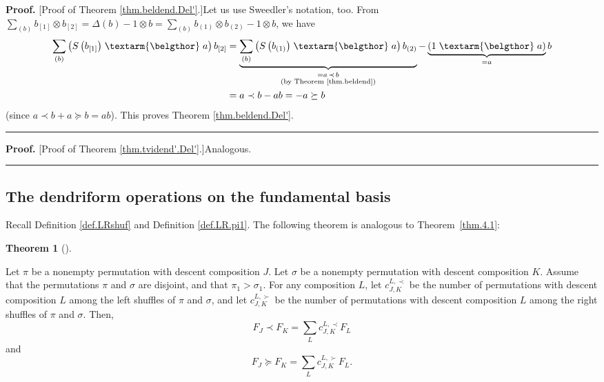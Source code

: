 \documentclass[numbers=enddot,12pt,final,onecolumn,notitlepage]{scrartcl}%
\theoremstyle{definition}
\newtheorem{theo}{Theorem}[section]
\newenvironment{theorem}[1][]
{\begin{theo}[#1]\begin{leftbar}}
{\end{leftbar}\end{theo}}
\newenvironment{proof}[1][Proof]{\noindent\textbf{#1.} }{\ \rule{0.5em}{0.5em}}
\newenvironment{verlong}{}{}
\newenvironment{noncompile}{}{}
\newcommand{\bel}{\left. \textarm{\belgthor} \right.}
\let\sumnonlimits\sum
\renewcommand{\sum}{\sumnonlimits\limits}
\begin{document}
\begin{verlong}
\begin{noncompile}
\begin{proof}
[Proof of Theorem \ref{thm.beldend.Del'}.]Let us use Sweedler's notation, too.
From $\sum_{\left(  b\right)  }b_{\left[  1\right]  }\otimes b_{\left[
2\right]  }=\Delta\left(  b\right)  -1\otimes b=\sum_{\left(  b\right)
}b_{\left(  1\right)  }\otimes b_{\left(  2\right)  }-1\otimes b$, we have%
\begin{align*}
\sum_{\left(  b\right)  }\left(  S\left(  b_{\left[  1\right]  }\right)
\bel a\right)  b_{\left[  2\right]  }  &  =\underbrace{\sum_{\left(  b\right)
}\left(  S\left(  b_{\left(  1\right)  }\right)  \bel a\right)  b_{\left(
2\right)  }}_{\substack{=a\left.  \prec\right.  b\\\text{(by Theorem
\ref{thm.beldend})}}}-\underbrace{\left(  1\bel a\right)  }_{=a}b\\
&  =a\left.  \prec\right.  b-ab=-a\left.  \succeq\right.  b
\end{align*}
(since $a\left.  \prec\right.  b+a\left.  \succeq\right.  b=ab$). This proves
Theorem \ref{thm.beldend.Del'}.
\end{proof}

\begin{proof}
[Proof of Theorem \ref{thm.tvidend'.Del'}.]Analogous.
\end{proof}
\end{noncompile}

\subsection{The dendriform operations on the fundamental basis}

Recall Definition \ref{def.LRshuf} and Definition \ref{def.LR.pi1}. The
following theorem is analogous to Theorem~\ref{thm.4.1}:

\begin{theorem}
\label{thm.dendri.4.1}Let $\pi$ be a nonempty permutation with descent
composition $J$. Let $\sigma$ be a nonempty permutation with descent
composition $K$. Assume that the permutations $\pi$ and $\sigma$ are disjoint,
and that $\pi_{1}>\sigma_{1}$. For any composition $L$, let $c_{J,K}^{L,\prec
}$ be the number of permutations with descent composition $L$ among the left
shuffles of $\pi$ and $\sigma$, and let $c_{J,K}^{L,\succ}$ be the number of
permutations with descent composition $L$ among the right shuffles of $\pi$
and $\sigma$. Then,%
\[
F_{J}\left.  \prec\right.  F_{K}=\sum_{L}c_{J,K}^{L,\prec}F_{L}%
\]
and%
\[
F_{J}\left.  \succeq\right.  F_{K}=\sum_{L}c_{J,K}^{L,\succ}F_{L}.
\]


\end{theorem}
\end{verlong}
\end{document}
